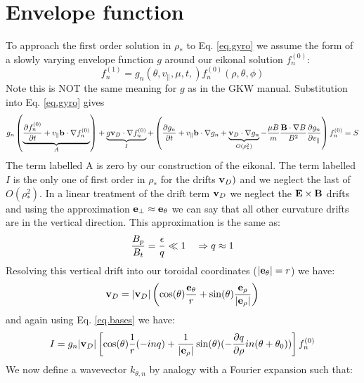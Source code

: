 \documentclass[a4paper,11pt]{article}
\begin{document}
\vspace*{5 pc}

\section{Envelope function}
To approach the first order solution in $\rho_*$ to Eq. \ref{eq.gyro} we assume the form of a slowly varying envelope function $g$ around our eikonal solution $f_n^{(0)}$:
\begin{equation}
 f_n^{(1)}=g_n(\theta,v_\parallel,\mu,t,)f_n^{(0)}(\rho,\theta,\phi)
\end{equation}
Note this is NOT the same meaning for $g$ as in the GKW manual. Substitution into Eq. \ref{eq.gyro} gives
\begin{equation}
g_n \left(\underbrace{{\partial f_n^{(0)} \over \partial t} + v_\parallel {\bf b}\cdot \nabla f_n^{(0)}}_A\right) + \underbrace{g{\bf v}_D \cdot \nabla f_n^{(0)}}_I + \left({\partial g_n \over \partial t} + v_\parallel{\bf b}\cdot\nabla g_n + \underbrace{{\bf v}_D \cdot \nabla g_n}_{O(\rho_*^2)} -{\mu B \over m}{{\bf B}\cdot \nabla B \over B^2}{\partial g_n \over \partial v_\parallel}\right)f_n^{(0)} = S
\label{eq.substitute}
\end{equation}
The term labelled A is zero by our construction of the eikonal.  The term labelled $I$ is the only one of first order in $\rho_*$ for the drifts ${\bf v}_D)$ and we neglect the last of $O(\rho_*^2)$.  In a linear treatment of the drift term ${\bf v}_D$ we neglect the ${\bf E} \times {\bf B}$ drifts and using the approximation ${\bf e}_\perp \approx {\bf e}_\theta$ we can say that all other curvature drifts are in the vertical direction.  This approximation is the same as:
\begin{equation}
{B_p \over B_t} = {\epsilon \over q} \ll 1 \quad \Rightarrow q \approx 1
\end{equation}
Resolving this vertical drift into our toroidal coordinates ($|{\bf e}_\theta|=r$) we have:
\begin{equation}
 {\bf v}_D = |{\bf v}_D|\left(\cos(\theta) {{\bf e}_\theta \over r} + \sin(\theta) {{\bf e}_\rho \over |{\bf e}_\rho|}\right)
\end{equation}
and again using Eq. \ref{eq.bases} we have:
\begin{equation}
 I = g_n|{\bf v}_D|\left[\cos(\theta){1 \over r}(-inq)+{1 \over |{\bf e}_\rho|}\sin(\theta)(-{\partial q \over \partial \rho} in(\theta+\theta_0))\right]f_n^{(0)} 
\end{equation}
We now define a wavevector $k_{\theta,n}$ by analogy with a Fourier expansion such that: 
\end{document}
